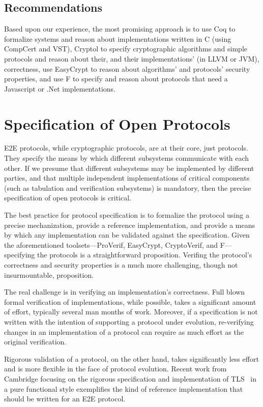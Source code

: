 \subsection{Recommendations}

Based upon our experience, the most promising approach is to use Coq
to formalize systems and reason about implementations written in C
(using CompCert and VST), Cryptol to specify cryptographic algorithms
and simple protocols and reason about their, and their
implementations' (in LLVM or JVM), correctness, use EasyCrypt to
reason about algorithms' and protocols' security properties, and use
F\* to specify and reason about protocols that need a Javascript or
.Net implementations.

\section{Specification of Open Protocols} 

E2E protocols, while cryptographic protocols, are at their core, just
protocols. They specify the means by which different subsystems
communicate with each other. If we presume that different subsystems
may be implemented by different parties, and that multiple independent
implementations of critical components (such as tabulation and
verification subsystems) is mandatory, then the precise specification
of open protocols is critical.

The best practice for protocol specification is to formalize the
protocol using a precise mechanization, provide a reference
implementation, and provide a means by which any implementation can be
validated against the specification. Given the aforementioned
toolsets---ProVerif, EasyCrypt, CryptoVerif, and F\*---specifying the
protocols is a straightforward proposition. Verifing the protocol's
correctness and security properties is a much more challenging, though
not insurmountable, proposition. 

The real challenge is in verifying an implementation's
correctness. Full blown formal verification of implementations, while
possible, takes a significant amount of effort, typically several man
months of work. Moreover, if a specification is not written with the
intention of supporting a protocol under evolution, re-verifying
changes in an implementation of a protocol can require as much effort
as the original verification.

Rigorous validation of a protocol, on the other hand, takes
significantly less effort and is more flexible in the face of protocol
evolution. Recent work from Cambridge focusing on the rigorous
specification and implementation of TLS~\cite{nqsb-TLS} in a pure
functional style exemplifies the kind of reference implementation that
should be written for an E2E protocol.

